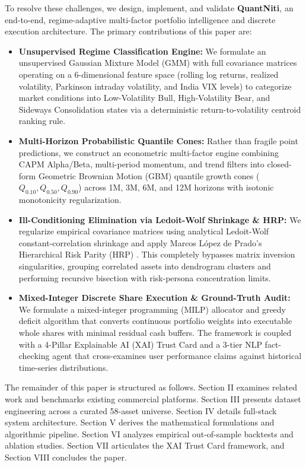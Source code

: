 \documentclass[conference]{IEEEtran}
\begin{document}
To resolve these challenges, we design, implement, and validate \textbf{QuantNiti}, an end-to-end, regime-adaptive multi-factor portfolio intelligence and discrete execution architecture. The primary contributions of this paper are:
\begin{itemize}
    \item \textbf{Unsupervised Regime Classification Engine:} We formulate an unsupervised Gaussian Mixture Model (GMM) with full covariance matrices operating on a 6-dimensional feature space (rolling log returns, realized volatility, Parkinson intraday volatility, and India VIX levels) to categorize market conditions into Low-Volatility Bull, High-Volatility Bear, and Sideways Consolidation states via a deterministic return-to-volatility centroid ranking rule.
    \item \textbf{Multi-Horizon Probabilistic Quantile Cones:} Rather than fragile point predictions, we construct an econometric multi-factor engine combining CAPM Alpha/Beta, multi-period momentum, and trend filters into closed-form Geometric Brownian Motion (GBM) quantile growth cones ($Q_{0.10}, Q_{0.50}, Q_{0.90}$) across 1M, 3M, 6M, and 12M horizons with isotonic monotonicity regularization.
    \item \textbf{Ill-Conditioning Elimination via Ledoit-Wolf Shrinkage \& HRP:} We regularize empirical covariance matrices using analytical Ledoit-Wolf constant-correlation shrinkage and apply Marcos L{\'o}pez de Prado's Hierarchical Risk Parity (HRP) \cite{lopez2016building}. This completely bypasses matrix inversion singularities, grouping correlated assets into dendrogram clusters and performing recursive bisection with risk-persona concentration limits.
    \item \textbf{Mixed-Integer Discrete Share Execution \& Ground-Truth Audit:} We formulate a mixed-integer programming (MILP) allocator and greedy deficit algorithm that converts continuous portfolio weights into executable whole shares with minimal residual cash buffers. The framework is coupled with a 4-Pillar Explainable AI (XAI) Trust Card and a 3-tier NLP fact-checking agent that cross-examines user performance claims against historical time-series distributions.
\end{itemize}

The remainder of this paper is structured as follows. Section II examines related work and benchmarks existing commercial platforms. Section III presents dataset engineering across a curated 58-asset universe. Section IV details full-stack system architecture. Section V derives the mathematical formulations and algorithmic pipeline. Section VI analyzes empirical out-of-sample backtests and ablation studies. Section VII articulates the XAI Trust Card framework, and Section VIII concludes the paper.
\end{document}
